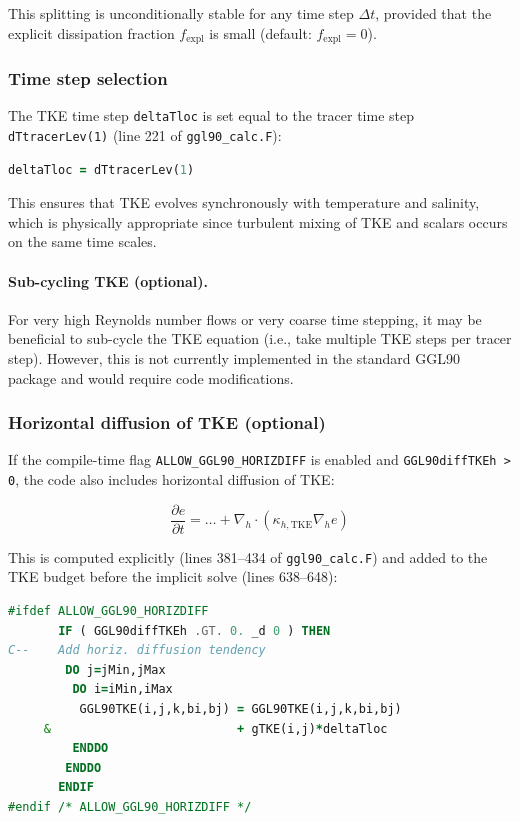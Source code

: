 \documentclass[12pt,letterpaper]{article}
\begin{document}
This splitting is unconditionally stable for any time step $\Delta t$, provided that the explicit dissipation fraction $f_{\text{expl}}$ is small (default: $f_{\text{expl}} = 0$).

\subsubsection{Time step selection}

The TKE time step \verb|deltaTloc| is set equal to the tracer time step \verb|dTtracerLev(1)| (line 221 of \verb|ggl90_calc.F|):

\begin{lstlisting}[language=Fortran,caption={(ggl90\_calc.F:L221) TKE time step}]
      deltaTloc = dTtracerLev(1)
\end{lstlisting}

This ensures that TKE evolves synchronously with temperature and salinity, which is physically appropriate since turbulent mixing of TKE and scalars occurs on the same time scales.

\paragraph{Sub-cycling TKE (optional).} For very high Reynolds number flows or very coarse time stepping, it may be beneficial to sub-cycle the TKE equation (i.e., take multiple TKE steps per tracer step). However, this is not currently implemented in the standard GGL90 package and would require code modifications.

\subsubsection{Horizontal diffusion of TKE (optional)}

If the compile-time flag \verb|ALLOW_GGL90_HORIZDIFF| is enabled and \verb|GGL90diffTKEh > 0|, the code also includes horizontal diffusion of TKE:

\begin{equation}
\frac{\partial e}{\partial t} = \ldots + \nabla_h \cdot \left( \kappa_{h,\text{TKE}} \nabla_h e \right)
\end{equation}

This is computed explicitly (lines 381--434 of \verb|ggl90_calc.F|) and added to the TKE budget before the implicit solve (lines 638--648):

\begin{lstlisting}[language=Fortran,caption={(ggl90\_calc.F:L638--648) Horizontal diffusion of TKE}]
#ifdef ALLOW_GGL90_HORIZDIFF
       IF ( GGL90diffTKEh .GT. 0. _d 0 ) THEN
C--    Add horiz. diffusion tendency
        DO j=jMin,jMax
         DO i=iMin,iMax
          GGL90TKE(i,j,k,bi,bj) = GGL90TKE(i,j,k,bi,bj)
     &                          + gTKE(i,j)*deltaTloc
         ENDDO
        ENDDO
       ENDIF
#endif /* ALLOW_GGL90_HORIZDIFF */
\end{lstlisting}
\end{document}
